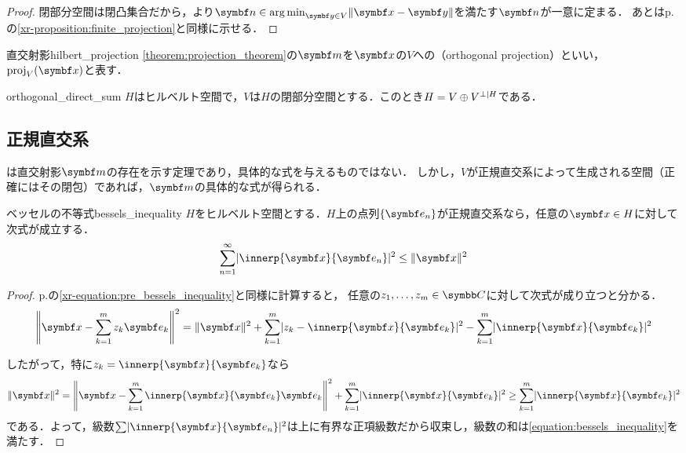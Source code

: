 \documentclass[../../main]{subfiles}
\begin{document}
\begin{proof}
  閉部分空間は閉凸集合だから，より\(\vect{n}\in\argmin_{\vect{y}\in V}\vnorm{\vect{x}-\vect{y}}\)を満たす\(\vect{n}\)が一意に定まる．
  あとはp.\pageref{xr-proposition:finite_projection}の\cref{xr-proposition:finite_projection}と同様に示せる．
\end{proof}

\begin{definition}{直交射影}{hilbert_projection}
  \cref{theorem:projection_theorem}の\(\vect{m}\)を\(\vect{x}\)の\(V\)への（orthogonal projection）といい，\(\proj_V(\vect{x})\)と表す．
\end{definition}

\begin{proposition}{}{orthogonal_direct_sum}
  \(H\)はヒルベルト空間で，\(V\)は\(H\)の閉部分空間とする．このとき\(H=V\oplus\pcomp[H]{V}\)である．
\end{proposition}

\subsection{正規直交系}

は直交射影\(\vect{m}\)の存在を示す定理であり，具体的な式を与えるものではない．
しかし，\(V\)が正規直交系によって生成される空間（正確にはその閉包）であれば，\(\vect{m}\)の具体的な式が得られる．

\begin{theorem}{ベッセルの不等式}{bessels_inequality}
  \(H\)をヒルベルト空間とする．\(H\)上の点列\(\seq{\vect{e}_n}\)が正規直交系なら，任意の\(\vect{x}\in H\)に対して次式が成立する．
  \begin{equation}
    \label{equation:bessels_inequality}
    \sum_{n=1}^\infty\abs{\innerp{\vect{x}}{\vect{e}_n}}^2 \leq \vnorm{\vect{x}}^2
  \end{equation}
\end{theorem}

\begin{proof}
  p.\pageref{xr-equation:pre_bessels_inequality}の\cref{xr-equation:pre_bessels_inequality}と同様に計算すると，
  任意の\(z_1,\dots,z_m\in\numset{C}\)に対して次式が成り立つと分かる．
  \[
    \vnorm*{\vect{x}-\sum_{k=1}^mz_k\vect{e}_k}^2 = \vnorm{\vect{x}}^2+\sum_{k=1}^m\abs{z_k-\innerp{\vect{x}}{\vect{e}_k}}^2-\sum_{k=1}^m\abs{\innerp{\vect{x}}{\vect{e}_k}}^2
  \]

  したがって，特に\(z_k=\innerp{\vect{x}}{\vect{e}_k}\)なら
  \[
    \vnorm{\vect{x}}^2 = \vnorm*{\vect{x}-\sum_{k=1}^m\innerp{\vect{x}}{\vect{e}_k}\vect{e}_k}^2+\sum_{k=1}^m\abs{\innerp{\vect{x}}{\vect{e}_k}}^2
    \geq \sum_{k=1}^m\abs{\innerp{\vect{x}}{\vect{e}_k}}^2
  \]
  である．よって，級数\(\sum\abs{\innerp{\vect{x}}{\vect{e}_n}}^2\)は上に有界な正項級数だから収束し，級数の和は\cref{equation:bessels_inequality}を満たす．
\end{proof}
\end{document}
